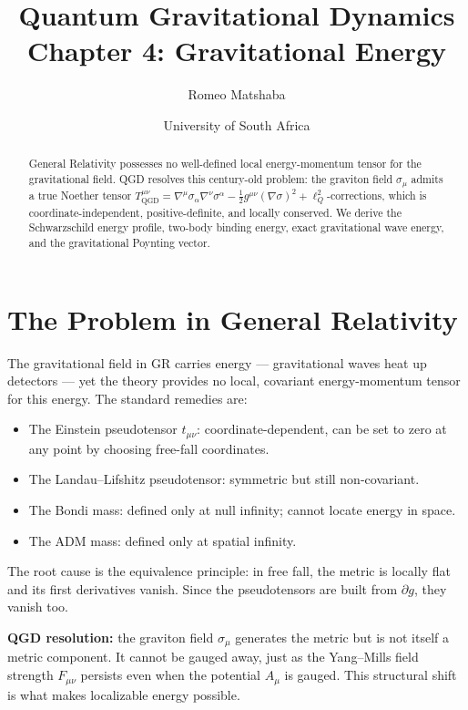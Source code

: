 \documentclass[11pt,a4paper]{article}
\title{\textbf{Quantum Gravitational Dynamics}\\[4pt]
\Large Chapter 4: Gravitational Energy}
\author{Romeo Matshaba}
\date{University of South Africa}
\theoremstyle{plain}
\theoremstyle{definition}
\theoremstyle{remark}
\newcommand{\lQ}{\ell_Q}
\begin{document}
\maketitle

\begin{abstract}
General Relativity possesses no well-defined local energy-momentum tensor for the gravitational field.  QGD resolves this century-old problem: the graviton field $\sigma_\mu$ admits a true Noether tensor $T^{\mu\nu}_{\mathrm{QGD}} = \nabla^\mu\sigma_\alpha\nabla^\nu\sigma^\alpha - \tfrac{1}{2}g^{\mu\nu}(\nabla\sigma)^2 + \lQ^2$-corrections, which is coordinate-independent, positive-definite, and locally conserved.  We derive the Schwarzschild energy profile, two-body binding energy, exact gravitational wave energy, and the gravitational Poynting vector.
\end{abstract}

\tableofcontents

\section{The Problem in General Relativity}
\label{sec:problem}

The gravitational field in GR carries energy --- gravitational waves heat up detectors --- yet the theory provides no local, covariant energy-momentum tensor for this energy.  The standard remedies are:

\begin{itemize}
  \item The Einstein pseudotensor $t_{\mu\nu}$: coordinate-dependent, can be set to zero at any point by choosing free-fall coordinates.
  \item The Landau--Lifshitz pseudotensor: symmetric but still non-covariant.
  \item The Bondi mass: defined only at null infinity; cannot locate energy in space.
  \item The ADM mass: defined only at spatial infinity.
\end{itemize}

The root cause is the equivalence principle: in free fall, the metric is locally flat and its first derivatives vanish.  Since the pseudotensors are built from $\partial g$, they vanish too.

\textbf{QGD resolution:} the graviton field $\sigma_\mu$ generates the metric but is not itself a metric component.  It cannot be gauged away, just as the Yang--Mills field strength $F_{\mu\nu}$ persists even when the potential $A_\mu$ is gauged.  This structural shift is what makes localizable energy possible.
\end{document}
